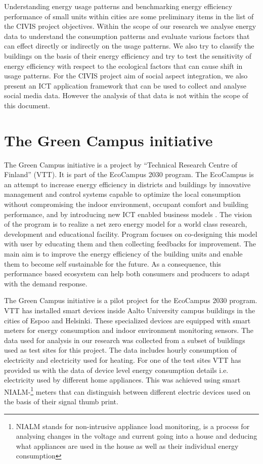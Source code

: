 Understanding energy usage patterns and benchmarking energy efficiency performance of small units within cities are some preliminary items in the list of the CIVIS project objectives. Within the scope of our research we analyse energy data to understand the consumption patterns and evaluate various factors that can effect directly or indirectly on the usage patterns. We also try to classify the buildings on the basis of their energy efficiency and try to test the sensitivity of energy efficiency with respect to the ecological factors that can cause shift in usage patterns. For the CIVIS project aim of social aspect integration, we also present an ICT application framework that can be used to collect and analyse social media data. However the analysis of that data is not within the scope of this document. 


\section{ The Green Campus initiative} \label{greencamp}

The Green Campus initiative is a project by ``Technical Research Centre of Finland'' (VTT). It is part of the EcoCampus 2030 program. The EcoCampus is an attempt to increase energy efficiency in districts and buildings by innovative management and control systems capable to optimize the local consumption without compromising the indoor environment, occupant comfort and building performance, and by introducing new ICT enabled business models \cite{ greencampus}. The vision of the program is to realize a net zero energy model for a world class research, development and educational facility. Program focuses on co-designing this model with user by educating them and then collecting feedbacks for improvement. The main aim is to improve the energy efficiency of the building units and enable them to become self sustainable for the future. As a consequence, this performance based ecosystem can help both consumers and producers to adapt with the demand response.

The Green Campus initiative is a pilot project for the EcoCampus 2030 program. VTT has installed smart devices inside Aalto University campus buildings in the cities of Espoo and Helsinki. These specialized devices are equipped with smart meters for energy consumption and indoor environment monitoring sensors.  The data used for analysis in our research was collected from a subset of buildings used as test sites for this project. The data includes hourly consumption of electricity and electricity used for heating. For one of the test sites VTT has provided us with the data of device level energy consumption details i.e. electricity used by different home appliances. This was achieved using smart NIALM-\footnote{ NIALM stands for non-intrusive appliance load monitoring,  is a process for analysing changes in the voltage and current going into a house and deducing what appliances are used in the house as well as their individual energy consumption }\cite{ hart1992nonintrusive} meters that can distinguish between different electric devices used on the basis of their signal thumb print.

